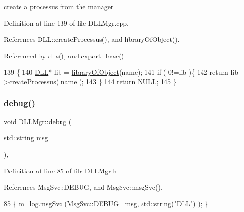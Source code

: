 create a processus from the manager 

Definition at line 139 of file D\+L\+L\+Mgr.\+cpp.



References D\+L\+L\+::create\+Processus(), and library\+Of\+Object().



Referenced by dlls(), and export\+\_\+base().


\begin{DoxyCode}
139                                                     \{
140   \hyperlink{classDLL}{DLL}* lib = \hyperlink{classDLLMgr_a7e8c992899b7357158aef047a2f15c51}{libraryOfObject}(name);
141   \textcolor{keywordflow}{if} ( 0!=lib )\{
142     \textcolor{keywordflow}{return} lib->\hyperlink{classDLL_a9136bcd5e5ca7894bd337241803735c3}{createProcessus}( name );
143   \}
144   \textcolor{keywordflow}{return} NULL;
145 \}
\end{DoxyCode}
\mbox{\label{classDLLMgr_ad5f2427768e6cfe25c255e7899e4203f}} 
\subsubsection{\texorpdfstring{debug()}{debug()}\hspace{0.1cm}{\footnotesize\ttfamily [1/2]}}
{\footnotesize\ttfamily void D\+L\+L\+Mgr\+::debug (\begin{DoxyParamCaption}\item[{std\+::string}]{msg }\end{DoxyParamCaption})\hspace{0.3cm}{\ttfamily [inline]}, {\ttfamily [private]}}



Definition at line 85 of file D\+L\+L\+Mgr.\+h.



References Msg\+Svc\+::\+D\+E\+B\+UG, and Msg\+Svc\+::msg\+Svc().


\begin{DoxyCode}
85 \{ \hyperlink{classDLLMgr_a64b523faed64378451ee76f6fbf0800d}{m\_log}.\hyperlink{classMsgSvc_ad25f18047920cc59a314e5098259711c}{msgSvc} (\hyperlink{classMsgSvc_ae671eb7301996cd049d2da8a65925926a1dbdcc82dce88370ec335883c83b38b0}{MsgSvc::DEBUG}   , msg, std::string(\textcolor{stringliteral}{"DLL"}) ); \}
\end{DoxyCode}
\mbox{\label{classDLLMgr_aef993dc0eea2972286957dda940ccdf2}} 
